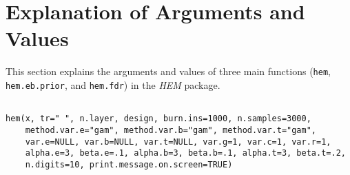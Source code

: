 \documentclass[12pt]{article}
\newcommand{\Rfunction}[1]{{\texttt{#1}}}
\newcommand{\Rpackage}[1]{{\textit{#1}}}
\begin{document}
\section{Explanation of Arguments and Values}
This section explains the arguments and values of three main functions (\Rfunction{hem}, \Rfunction{hem.eb.prior}, 
and \Rfunction{hem.fdr}) in the \Rpackage{HEM} package.

\begin{verbatim}

hem(x, tr=" ", n.layer, design, burn.ins=1000, n.samples=3000,
    method.var.e="gam", method.var.b="gam", method.var.t="gam",
    var.e=NULL, var.b=NULL, var.t=NULL, var.g=1, var.c=1, var.r=1,
    alpha.e=3, beta.e=.1, alpha.b=3, beta.b=.1, alpha.t=3, beta.t=.2,
    n.digits=10, print.message.on.screen=TRUE)

\end{verbatim}
   
\end{document}
